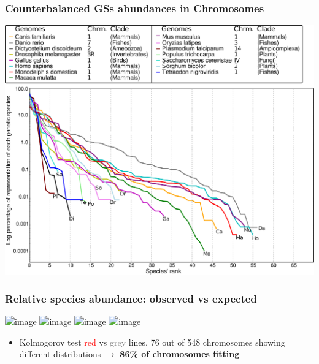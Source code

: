 \documentclass[hyperref={pagebackref=true},table]{beamer}
\begin{document}
\begin{frame}
  \frametitle{Counterbalanced GSs abundances in Chromosomes}
  \begin{center}
   \includegraphics[height=.8\textheight]{pictures/untbgen/SAD_chromosomes.pdf}
  \end{center}
\end{frame}

\begin{frame}
  \frametitle{Relative species abundance: observed vs expected}
  \begin{center}
    \includegraphics<1>[width=.97\textwidth]{pictures/untbgen/ra_chroms-1.png}
    \includegraphics<2>[width=.97\textwidth]{pictures/untbgen/ra_chroms-2.png}
    \includegraphics<3>[width=.97\textwidth]{pictures/untbgen/ra_chroms-3.png}
    \includegraphics<4->[width=.97\textwidth]{pictures/untbgen/ra_chroms-5.png}
  \end{center}
  \begin{itemize}
  \item<5> Kolmogorov test \textcolor{red}{red} vs \textcolor{gray}{grey} lines. 76 out of 548 chromosomes showing different distributions $\rightarrow$ \textbf{86\% of chromosomes fitting}
  \end{itemize}
\end{frame}
\end{document}
